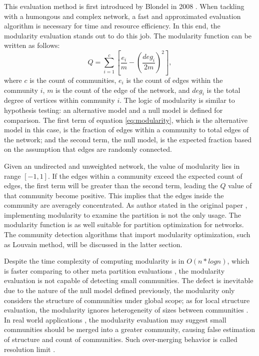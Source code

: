 \documentclass[12pt]{article}
\begin{document}
This evaluation method is first introduced by Blondel in 2008 \cite{12}. When tackling with a humongous and complex network, a fast and approximated evaluation algorithm is necessary for time and resource efficiency. In this end, the modularity evaluation stands out to do this job. The modularity function \cite{13} can be written as follows:
\begin{equation}\label{eq:modularity}
Q = \sum_{i=1}^c \left[  \frac{e_i}{m} - \left( \frac{deg_i}{2m} \right)^2  \right],
\end{equation}
where $c$ is the count of communities, $e_i$ is the count of edges within the community $i$, $m$ is the count of the edge of the network, and $deg_i$ is the total degree of vertices within community $i$. The logic of modularity is similar to hypothesis testing: an alternative model and a null model is defined for comparison. The first term of equation \eqref{eq:modularity}, which is the alternative model in this case, is the fraction of edges within a community to total edges of the network; and the second term, the null model, is the expected fraction based on the assumption that edges are randomly connected.

\bigbreak

Given an undirected and unweighted network, the value of modularity lies in range $[-1, 1]$. If the edges within a community exceed the expected count of edges, the first term will be greater than the second term, leading the $Q$ value of that community become positive. This implies that the edges inside the community are averagely concentrated. As author stated in the original paper \cite{12}, implementing modularity to examine the partition is not the only usage. The modularity function is as well suitable for partition optimization for  networks. The community detection algorithms that import modularity optimization, such as Louvain method, will be discussed in the latter section.

\bigbreak

Despite the time complexity of computing modularity is in $O(n*log n)$, which is faster comparing to other meta partition evaluations \cite{2, 12}, the modularity evaluation is not capable of detecting small communities. The defect is inevitable due to the nature of the null model defined previously, the modularity only considers the structure of communities under global scope; as for local structure evaluation, the modularity ignores heterogeneity of sizes between communities \cite{13}. In real world applications \cite{9, 10}, the modularity evaluation may suggest small communities should be merged into a greater community, causing false estimation of structure and count of communities. Such over-merging behavior is called resolution limit \cite{13}.
\end{document}
